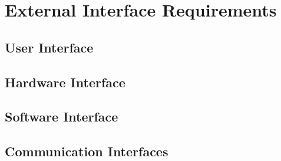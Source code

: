 {
\chapter{External Interface Requirements}
\section{User Interface}
\section{Hardware Interface}
\section{Software Interface}
\section{Communication Interfaces}
}